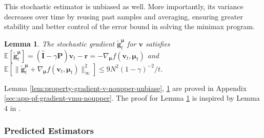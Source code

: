 \documentclass[12pt]{article}
\newtheorem{lemma}{Lemma}
\begin{document}
This stochastic estimator is unbiased as well. More importantly, its variance decreases over time by reusing past samples and averaging, ensuring greater stability and better control of the error bound in solving the minimax program.

\begin{lemma}
    The stochastic gradient $\tilde{\boldsymbol{g}}_t^{\boldsymbol{\mu}}$ for $\boldsymbol{v}$ satisfies $\mathbb{E}[\tilde{\boldsymbol{g}}_t^{\boldsymbol{\mu}}] = (\hat{\boldsymbol{\text{I}}} - \gamma \boldsymbol{\text{P}}) \boldsymbol{v}_t - \boldsymbol{\text{r}} = - \nabla_{\boldsymbol{\mu}} f(\boldsymbol{v}_t,\boldsymbol{\mu}_t) $ and $\mathbb{E}[\|\tilde{\boldsymbol{g}}_t^{\boldsymbol{\mu}}+\nabla_{\boldsymbol{\mu}} f(\boldsymbol{v}_t,\boldsymbol{\mu}_t) \|_{\infty}^2] \le 9N^2(1-\gamma)^{-2}/t$.
    \label{lem:property-gradient-mu-noupper-unbiase}
\end{lemma}

Lemma \ref{lem:property-gradient-v-noupper-unbiase}, \ref{lem:property-gradient-mu-noupper-unbiase} are proved in Appendix \ref{sec:app-pf-gradient-vmu-noupper}. The proof for Lemma \ref{lem:property-gradient-mu-noupper-unbiase} is inspired by Lemma 4 in \cite{jin2020efficiently}.


\subsubsection{Predicted Estimators}
\end{document}
